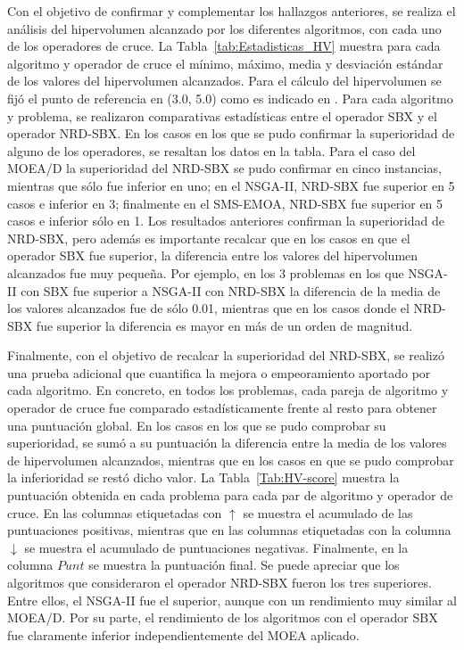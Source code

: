 Con el objetivo de confirmar y complementar los hallazgos anteriores, se realiza el análisis del hipervolumen alcanzado por los diferentes algoritmos, con cada uno de los operadores de cruce.
%
La Tabla~\ref{tab:Estadisticas_HV} muestra para cada algoritmo y operador de cruce el mínimo, máximo, media y desviación estándar de los valores del hipervolumen alcanzados.
%
Para el cálculo del hipervolumen se fijó el punto de referencia en (3.0, 5.0) como es indicado en \cite{Joel:OperatorAHX}.
%
Para cada algoritmo y problema, se realizaron comparativas estadísticas entre el operador SBX y el operador NRD-SBX.
%
En los casos en los que se pudo confirmar la superioridad de alguno de los operadores, se resaltan los datos en la tabla.
%
Para el caso del MOEA/D la superioridad del NRD-SBX se pudo confirmar en cinco instancias, mientras que sólo fue inferior en uno; en el NSGA-II, NRD-SBX fue superior en 5 casos e inferior en 3; finalmente en el SMS-EMOA, NRD-SBX fue superior en 5 casos e inferior sólo en 1. 
%
Los resultados anteriores confirman la superioridad de NRD-SBX, pero además es importante recalcar que en los casos en que el operador SBX fue superior, la diferencia entre los valores del hipervolumen alcanzados fue muy pequeña.
%
Por ejemplo, en los 3 problemas en los que NSGA-II con SBX fue superior a NSGA-II con NRD-SBX la diferencia de la media de los valores alcanzados fue de sólo 0.01, mientras que en los casos donde el NRD-SBX fue superior la diferencia es mayor en más de un orden de magnitud.

Finalmente, con el objetivo de recalcar la superioridad del NRD-SBX, se realizó una prueba adicional que cuantifica la mejora o empeoramiento aportado por cada algoritmo.
%
En concreto, en todos los problemas, cada pareja de algoritmo y operador de cruce fue comparado estadísticamente frente al resto para obtener una puntuación global.
%
En los casos en los que se pudo comprobar su superioridad, se sumó a su puntuación la diferencia entre la media de los valores de hipervolumen alcanzados, mientras que en los casos en que se pudo comprobar la inferioridad se restó dicho valor.
%
La Tabla~\ref{Tab:HV-score} muestra la puntuación obtenida en cada problema para cada par de algoritmo y operador de cruce. En las columnas etiquetadas con $\uparrow$ se muestra el acumulado de las puntuaciones positivas, mientras que en las columnas etiquetadas con la columna $\downarrow$ se muestra el acumulado de puntuaciones negativas. Finalmente, en la columna $Punt$ se muestra la puntuación final.
%
Se puede apreciar que los algoritmos que consideraron el operador NRD-SBX fueron los tres superiores.
%
Entre ellos, el NSGA-II fue el superior, aunque con un rendimiento muy similar al MOEA/D.
%
Por su parte, el rendimiento de los algoritmos con el operador SBX fue claramente inferior independientemente del MOEA aplicado.


